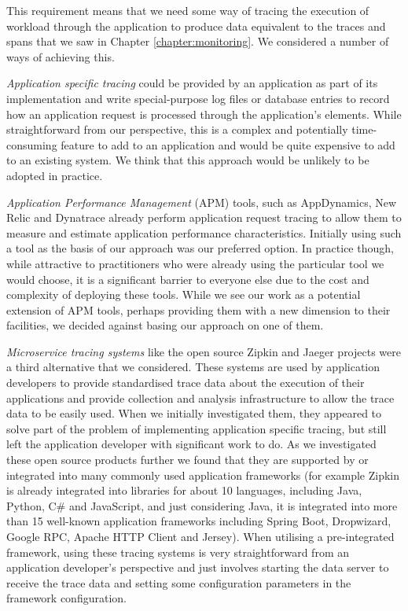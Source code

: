 This requirement means that we need some way of tracing the execution of workload through the application to produce data equivalent to the traces and spans that we saw in Chapter \ref{chapter:monitoring}.  We considered a number of ways of achieving this.

\emph{Application specific tracing} could be provided by an application as part of its implementation and write special-purpose log files or database entries to record how an application request is processed through the application's elements.  While straightforward from our perspective, this is a complex and potentially time-consuming feature to add to an application and would be quite expensive to add to an existing system.  We think that this approach would be unlikely to be adopted in practice.

\emph{Application Performance Management} (APM) tools, such as AppDynamics, New Relic and Dynatrace \cite{appdynamics2018, newrelic2018, dynatrace2018} already perform application request tracing to allow them to measure and estimate application performance characteristics.  Initially using such a tool as the basis of our approach was our preferred option.  In practice though, while attractive to practitioners who were already using the particular tool we would choose, it is a significant barrier to everyone else due to the cost and complexity of deploying these tools.  While we see our work as a potential extension of APM tools, perhaps providing them with a new dimension to their facilities, we decided against basing our approach on one of them.

\emph{Microservice tracing systems} like the open source Zipkin and Jaeger \cite{zipkin2018, jaeger2018} projects were a third alternative that we considered.  These systems are used by application developers to provide standardised trace data about the execution of their applications and provide collection and analysis infrastructure to allow the trace data to be easily used.  When we initially investigated them, they appeared to solve part of the problem of implementing application specific tracing, but still left the application developer with significant work to do.  As we investigated these open source products further we found that they are supported by or integrated into many commonly used application frameworks (for example Zipkin is already integrated into libraries for about 10 languages, including Java, Python, C\# and JavaScript, and just considering Java, it is integrated into more than 15 well-known application frameworks including Spring Boot, Dropwizard, Google RPC, Apache HTTP Client and Jersey).  When utilising a pre-integrated framework, using these tracing systems is very straightforward from an application developer's perspective and just involves starting the data server to receive the trace data and setting some configuration parameters in the framework configuration.

